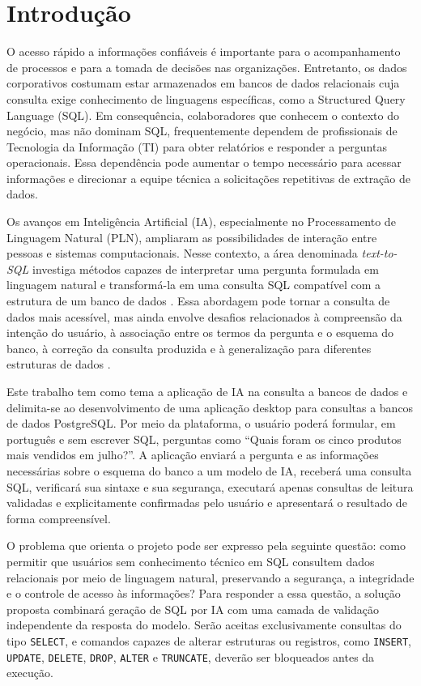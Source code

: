 \chapter{Introdução} \label{cap:01}

O acesso rápido a informações confiáveis é importante para o acompanhamento de processos e para a tomada de decisões nas organizações. Entretanto, os dados corporativos costumam estar armazenados em bancos de dados relacionais cuja consulta exige conhecimento de linguagens específicas, como a Structured Query Language (SQL). Em consequência, colaboradores que conhecem o contexto do negócio, mas não dominam SQL, frequentemente dependem de profissionais de Tecnologia da Informação (TI) para obter relatórios e responder a perguntas operacionais. Essa dependência pode aumentar o tempo necessário para acessar informações e direcionar a equipe técnica a solicitações repetitivas de extração de dados.

Os avanços em Inteligência Artificial (IA), especialmente no Processamento de Linguagem Natural (PLN), ampliaram as possibilidades de interação entre pessoas e sistemas computacionais. Nesse contexto, a área denominada \textit{text-to-SQL} investiga métodos capazes de interpretar uma pergunta formulada em linguagem natural e transformá-la em uma consulta SQL compatível com a estrutura de um banco de dados \cite{deng2022recent}. Essa abordagem pode tornar a consulta de dados mais acessível, mas ainda envolve desafios relacionados à compreensão da intenção do usuário, à associação entre os termos da pergunta e o esquema do banco, à correção da consulta produzida e à generalização para diferentes estruturas de dados \cite{yu2018spider}.

Este trabalho tem como tema a aplicação de IA na consulta a bancos de dados e delimita-se ao desenvolvimento de uma aplicação desktop para consultas a bancos de dados PostgreSQL. Por meio da plataforma, o usuário poderá formular, em português e sem escrever SQL, perguntas como ``Quais foram os cinco produtos mais vendidos em julho?''. A aplicação enviará a pergunta e as informações necessárias sobre o esquema do banco a um modelo de IA, receberá uma consulta SQL, verificará sua sintaxe e sua segurança, executará apenas consultas de leitura validadas e explicitamente confirmadas pelo usuário e apresentará o resultado de forma compreensível.

O problema que orienta o projeto pode ser expresso pela seguinte questão: como permitir que usuários sem conhecimento técnico em SQL consultem dados relacionais por meio de linguagem natural, preservando a segurança, a integridade e o controle de acesso às informações? Para responder a essa questão, a solução proposta combinará geração de SQL por IA com uma camada de validação independente da resposta do modelo. Serão aceitas exclusivamente consultas do tipo \texttt{SELECT}, e comandos capazes de alterar estruturas ou registros, como \texttt{INSERT}, \texttt{UPDATE}, \texttt{DELETE}, \texttt{DROP}, \texttt{ALTER} e \texttt{TRUNCATE}, deverão ser bloqueados antes da execução.

